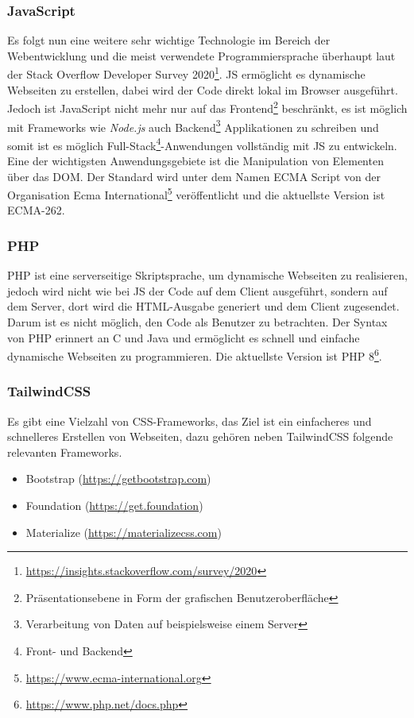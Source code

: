 \subsubsection{JavaScript}
Es folgt nun eine weitere sehr wichtige Technologie im Bereich der
Webentwicklung und die meist verwendete Programmiersprache überhaupt laut der
Stack Overflow Developer Survey
2020\footnote{\url{https://insights.stackoverflow.com/survey/2020}}. \ac*{JS}
ermöglicht es dynamische Webseiten zu erstellen, dabei wird der Code direkt
lokal im Browser ausgeführt. Jedoch ist JavaScript nicht mehr nur auf das
Frontend\footnote{Präsentationsebene in Form der grafischen Benutzeroberfläche}
beschränkt, es ist möglich mit Frameworks wie \textit{Node.js} auch
Backend\footnote{Verarbeitung von Daten auf beispielsweise einem Server}
Applikationen zu schreiben und somit ist es möglich Full-Stack\footnote{Front-
und Backend}-Anwendungen vollständig mit \acl*{JS} zu entwickeln. Eine der
wichtigsten Anwendungsgebiete ist die Manipulation von Elementen über das
\ac*{DOM}. Der Standard wird unter dem Namen ECMA Script von der Organisation
Ecma International\footnote{\url{https://www.ecma-international.org}}
veröffentlicht und die aktuellste Version ist ECMA-262.

\subsubsection{PHP}
\ac*{PHP} ist eine serverseitige Skriptsprache, um dynamische Webseiten zu realisieren, jedoch
wird nicht wie bei \acl*{JS} der Code auf dem Client ausgeführt, sondern auf dem
Server, dort wird die HTML-Ausgabe generiert und dem Client zugesendet. Darum
ist es nicht möglich, den Code als Benutzer zu betrachten. Der Syntax von PHP
erinnert an C und Java und ermöglicht es schnell und einfache dynamische
Webseiten zu programmieren. Die aktuellste Version ist
\acs*{PHP} 8\footnote{\url{https://www.php.net/docs.php}}.


\subsubsection{TailwindCSS}
Es gibt eine Vielzahl von CSS-Frameworks, das Ziel ist ein einfacheres und
schnelleres Erstellen von Webseiten, dazu gehören neben TailwindCSS folgende
relevanten Frameworks.

\begin{itemize}
  \item Bootstrap (\url{https://getbootstrap.com})
  \item Foundation (\url{https://get.foundation})
  \item Materialize (\url{https://materializecss.com})
\end{itemize}

